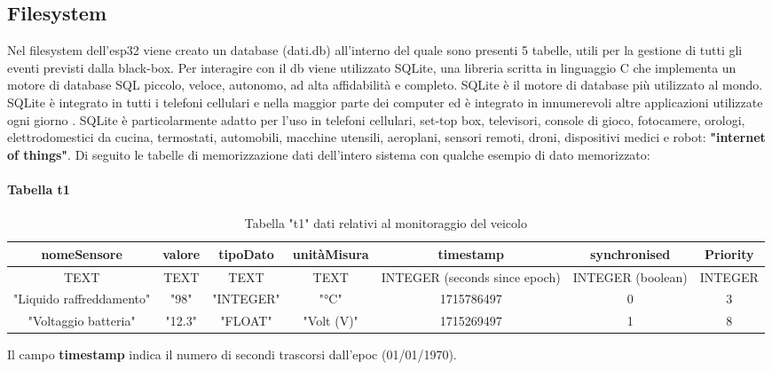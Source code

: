 \documentclass[12pt, a4paper, italian]{report}
\numberwithin{figure}{chapter}
\numberwithin{table}{chapter}
\begin{document}
\subsection{Filesystem}
Nel filesystem dell'esp32 viene creato un database (dati.db) all'interno del quale sono presenti 5 tabelle, utili per la gestione di tutti gli eventi previsti dalla black-box. Per interagire con il db viene utilizzato SQLite, una libreria scritta in linguaggio C che implementa un motore di database SQL piccolo, veloce, autonomo, ad alta affidabilità e completo. SQLite è il motore di database più utilizzato al mondo. SQLite è integrato in tutti i telefoni cellulari e nella maggior parte dei computer ed è integrato in innumerevoli altre applicazioni utilizzate ogni giorno \cite{sqliteWhentoUse}. SQLite è particolarmente adatto per l'uso in telefoni cellulari, set-top box, televisori, console di gioco, fotocamere, orologi, elettrodomestici da cucina, termostati, automobili, macchine utensili, aeroplani, sensori remoti, droni, dispositivi medici e robot: \textbf{"internet of things"}.
Di seguito le tabelle di memorizzazione dati dell'intero sistema con qualche esempio di dato memorizzato:

\paragraph{Tabella t1}
\begin{table}[h!]
  \centering 
  \begin{adjustbox}{max width=\textwidth}
    \begin{tabular}{|c|c|c|c|c|c|c|}
      \hline
      \textbf{nomeSensore} & \textbf{valore} & \textbf{tipoDato} & \textbf{unitàMisura} & \textbf{timestamp} & \textbf{synchronised} & \textbf{Priority} \\
      \hline
      TEXT & TEXT & TEXT & TEXT & INTEGER (seconds since epoch) & INTEGER (boolean) & INTEGER \\
      \hline
      "Liquido raffreddamento" & "98" & "INTEGER" & "°C" & 1715786497 & 0 & 3 \\
      \hline
      "Voltaggio batteria" & "12.3" & "FLOAT" & "Volt (V)" & 1715269497 & 1 & 8 \\
      \hline
    \end{tabular}
  \end{adjustbox}
  \caption{Tabella "t1" dati relativi al monitoraggio del veicolo}
  \label{tab:t1 monitoraggio}
\end{table}
Il campo \textbf{timestamp} indica il numero di secondi trascorsi dall'epoc (01/01/1970).
\end{document}
